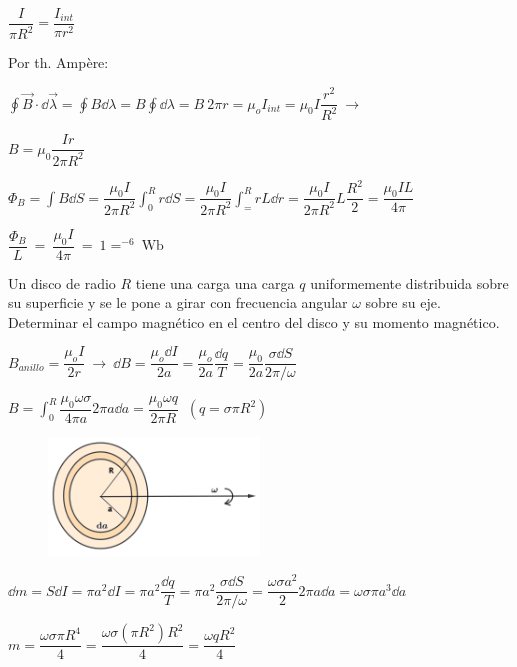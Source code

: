 $\dfrac I{\pi R^2}=\dfrac{I_{int}}{\pi r^2}$

Por th. Ampère: 

$\displaystyle \oint \vec B \cdot \dd \vec \lambda=\oint B \dd \lambda =B\oint \dd \lambda = B\ 2\pi r =\mu_o I_{int}=\mu_0 I \dfrac {r^2}{R^2} \ \to $ 

$B=\mu_0 \dfrac{Ir}{2\pi R^2}$

$\displaystyle \Phi_B=\int B \dd S = \dfrac{\mu_0 I}{2\pi R^2} \int_0^R
r \dd S =  \dfrac{\mu_0 I}{2\pi R^2} \int_=^R r L \dd r =  \dfrac{\mu_0 I}{2\pi R^2} L \dfrac {R^2}{2} =   \dfrac{\mu_0 I L}{4\pi}$

$\dfrac{\Phi_B}{L} \ = \  \dfrac{\mu_0 I}{4\pi} \ = \ 1=^{-6} \ \mathrm{Wb}$

\begin{prob}
Un disco de radio $R$	tiene una carga una carga $q$ uniformemente distribuida sobre su superficie y se le pone a girar con frecuencia angular $\omega$ sobre su eje. Determinar el campo magnético en el centro del disco y su momento magnético.
\end{prob}

\begin{multicols}{2}
	$B_{anillo}=\dfrac{\mu_o I}{2 r} \ \to \ \dd B=\dfrac{\mu_o \dd I}{2 a}=\dfrac{\mu_o}{2a} \dfrac {\dd q}{T}=\dfrac{\mu_0}{2a} \dfrac{\sigma \dd S}{2\pi / \omega}$
	
	$\displaystyle B= \int_0^R \dfrac{\mu_0 \omega \sigma}{4 \pi a} 2 \pi a \dd a = \dfrac{\mu_0 \omega q}{2\pi R}\ $ \textcolor{gris}{$(q=\sigma \pi R^2)$}
	\begin{figure}[H]
	\centering
	\includegraphics[width=0.5\textwidth]{imagenes/imagenes27/T27IM14.png}
\end{figure}
\end{multicols}

$\dd m=S\dd I=\pi a^2 \dd I=\pi a^2 \dfrac{\dd q}{T}=\pi a^2 \dfrac{\sigma \dd S}{2\pi /\omega}=\dfrac{\omega \sigma a^2}{2}2\pi a \dd a=\omega \sigma \pi a^3 \dd a$

$m=\dfrac{\omega \sigma \pi R^4}{4}=\dfrac{\omega \sigma (\pi R^2) R^2}{4}=\dfrac{\omega q R^2}{4}$

